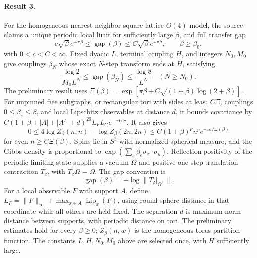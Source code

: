\documentclass[11pt]{article}
\begin{document}
\paragraph{Result 3.} For the homogeneous nearest-neighbor square-lattice \(O(4)\) model, the source claims a unique periodic local limit for sufficiently large \(\beta\), and full transfer gap
\[
 c\sqrt\beta\,e^{-\pi\beta}\le\operatorname{gap}(\beta)
 \le C\sqrt\beta\,e^{-\pi\beta},\qquad\beta\ge\beta_0,
\]
with \(0<c<C<\infty\). Fixed dyadic \(L\), terminal coupling \(H\), and integers \(N_0,M_0\) give couplings \(\beta_N\) whose exact \(N\)-step transform ends at \(H\), satisfying
\[
 \frac{\log2}{M_0L^N}\le\operatorname{gap}(\beta_N)\le\frac{\log8}{L^N}\quad(N\ge N_0).
\]
The preliminary result uses \(\Xi(\beta)=\exp[\pi\beta+C\sqrt{(1+\beta)\log(2+\beta)}]\). For unpinned free subgraphs, or rectangular tori with sides at least \(C\Xi\), couplings \(0\le\beta_e\le\beta\), and local Lipschitz observables at distance \(d\), it bounds covariance by \(C(1+\beta+|A|+|A'|+d)^{20}L_FL_Ge^{-cd/\Xi}\). It also gives
\[
 0\le4\log Z_\beta(n,n)-\log Z_\beta(2n,2n)
 \le C(1+\beta)^pn^p e^{-cn/\Xi(\beta)}
\]
for even \(n\ge C\Xi(\beta)\). Spins lie in $S^3$ with normalized spherical measure, and the Gibbs density is proportional to $\exp(\sum_e\beta_e\sigma_x\cdot\sigma_y)$. Reflection positivity of the periodic limiting state supplies a vacuum $\Omega$ and positive one-step translation contraction $T_\beta$, with $T_\beta\Omega=\Omega$. The gap convention is
\[
 \operatorname{gap}(\beta)=-\log\|T_\beta|_{\Omega^\perp}\|.
\]
For a local observable $F$ with support $A$, define $L_F=\|F\|_\infty+\max_{x\in A}\operatorname{Lip}_x(F)$, using round-sphere distance in that coordinate while all others are held fixed. The separation $d$ is maximum-norm distance between supports, with periodic distance on tori. The preliminary estimates hold for every $\beta\ge0$; $Z_\beta(n,w)$ is the homogeneous torus partition function. The constants $L,H,N_0,M_0$ above are selected once, with $H$ sufficiently large.
\end{document}
